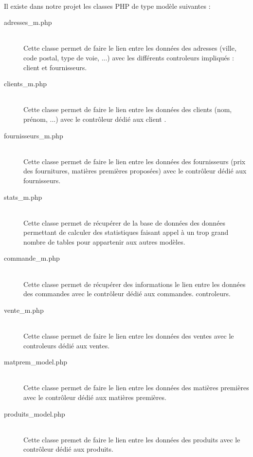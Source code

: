     \paragraph{}
        Il existe dans notre projet les classes PHP de type modèle suivantes :
        \begin{description}
            \item[adresses\_m.php]\hfill \\
                Cette classe permet de faire le lien entre les données des
                adresses (ville, code postal, type de voie, ...) avec les
                différents controleurs impliqués : client et fournisseurs.
            \item[clients\_m.php]\hfill \\
                Cette classe permet de faire le lien entre les données des
                clients (nom, prénom, ...) avec le contrôleur dédié aux client
                .
            \item[fournisseurs\_m.php]\hfill \\
                Cette classe permet de faire le lien entre les données des
                fournisseurs (prix des fournitures, matières premières
                proposées) avec le contrôleur dédié aux fournisseurs.
            \item[stats\_m.php]\hfill \\
                Cette classe permet de récupérer de la base de données des
                données permettant de calculer des statistiques faisant appel
                à un trop grand nombre de tables pour appartenir aux autres
                modèles.
            \item[commande\_m.php]\hfill \\
                Cette classe permet de récupérer des informations le lien
                entre les données des commandes avec le contrôleur dédié aux
                commandes. controleurs.
            \item[vente\_m.php]\hfill \\
                Cette classe permet de faire le lien entre les données des
                ventes avec le controleurs dédié aux ventes.
            \item[matprem\_model.php]\hfill \\
                Cette classe permet de faire le lien entre les données des
                matières premières avec le contrôleur dédié aux matières
                premières.
            \item[produits\_model.php]\hfill \\
                Cette classe premet de faire le lien entre les données des
                produits avec le contrôleur dédié aux produits.
        \end{description}



